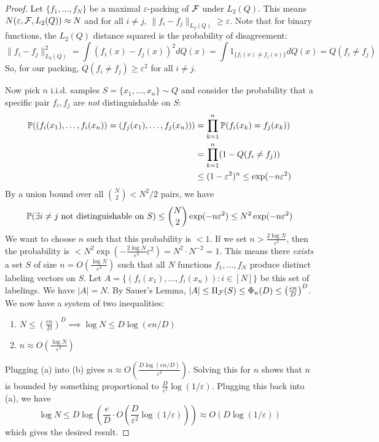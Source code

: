 \begin{proof}
Let $\{f_1, \dots, f_N\}$ be a maximal $\varepsilon$-packing of $\mathcal{F}$ under $L_2(Q)$. This means $N(\varepsilon, \mathcal{F}, L_2(Q)) \approx N$ and for all $i \ne j$, $\|f_i - f_j\|_{L_2(Q)} \ge \varepsilon$. Note that for binary functions, the $L_2(Q)$ distance squared is the probability of disagreement:
    $$
    \|f_i - f_j\|_{L_2(Q)}^2 = \int (f_i(x) - f_j(x))^2 dQ(x) = \int 1_{\{f_i(x) \ne f_j(x)\}} dQ(x) = Q(f_i \ne f_j)
    $$
So, for our packing, $Q(f_i \ne f_j) \ge \varepsilon^2$ for all $i \ne j$.
    
Now pick $n$ i.i.d. samples $S = \{x_1, \dots, x_n\} \sim Q$ and consider the probability that a specific pair $f_i, f_j$ are \emph{not} distinguishable on $S$:
    \begin{align*}
    \mathbb{P}( (f_i(x_1), \dots, f_i(x_n)) = (f_j(x_1), \dots, f_j(x_n)) ) &= \prod_{k=1}^n \mathbb{P}(f_i(x_k) = f_j(x_k)) \\
    &= \prod_{k=1}^n (1 - Q(f_i \ne f_j)) \\
    &\le (1 - \varepsilon^2)^n \le \exp(-n \varepsilon^2)
    \end{align*}
 By a union bound over all $\binom{N}{2} < N^2/2$ pairs, we have
    $$
    \mathbb{P}(\exists i \ne j \text{ not distinguishable on } S) \le \binom{N}{2} \exp(-n \varepsilon^2) \le N^2 \exp(-n \varepsilon^2)
    $$
 We want to choose $n$ such that this probability is $< 1$. If we set $n > \frac{2 \log N}{\varepsilon^2}$, then the probability is $< N^2 \exp(-\frac{2 \log N}{\varepsilon^2} \varepsilon^2) = N^2 \cdot N^{-2} = 1$. This means there \emph{exists} a set $S$ of size $n = O(\frac{\log N}{\varepsilon^2})$ such that all $N$ functions $f_1, \dots, f_N$ produce distinct labeling vectors on $S$. Let $A = \{ (f_i(x_1), \dots, f_i(x_n)) : i \in [N] \}$ be this set of labelings. We have $|A| = N$. By Sauer's Lemma, $|A| \le \Pi_{\mathcal{F}}(S) \le \Phi_n(D) \le \left(\frac{en}{D}\right)^D$. We now have a system of two inequalities:
    \begin{enumerate}
        \item $N \le \left(\frac{en}{D}\right)^D \implies \log N \le D \log(en/D)$
        \item $n \approx O\left(\frac{\log N}{\varepsilon^2}\right)$
    \end{enumerate}
Plugging (a) into (b) gives $n \approx O\left(\frac{D \log(en/D)}{\varepsilon^2}\right)$. Solving this for $n$ shows that $n$ is bounded by something proportional to $\frac{D}{\varepsilon^2} \log(1/\varepsilon)$. Plugging this back into (a), we have
    $$
    \log N \le D \log\left(\frac{e}{D} \cdot O\left(\frac{D}{\varepsilon^2} \log(1/\varepsilon)\right)\right) \approx O(D \log(1/\varepsilon))
    $$
which gives the desired result.
\end{proof}

